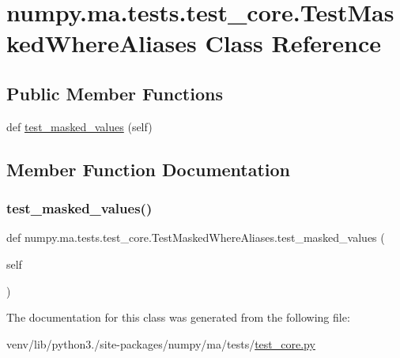 \hypertarget{classnumpy_1_1ma_1_1tests_1_1test__core_1_1TestMaskedWhereAliases}{}\section{numpy.\+ma.\+tests.\+test\+\_\+core.\+Test\+Masked\+Where\+Aliases Class Reference}
\label{classnumpy_1_1ma_1_1tests_1_1test__core_1_1TestMaskedWhereAliases}
\subsection*{Public Member Functions}
\begin{DoxyCompactItemize}
\item 
def \hyperlink{classnumpy_1_1ma_1_1tests_1_1test__core_1_1TestMaskedWhereAliases_acd993e3ab66673a73483f16f93eb00c7}{test\+\_\+masked\+\_\+values} (self)
\end{DoxyCompactItemize}


\subsection{Member Function Documentation}
\mbox{\label{classnumpy_1_1ma_1_1tests_1_1test__core_1_1TestMaskedWhereAliases_acd993e3ab66673a73483f16f93eb00c7}} 
\subsubsection{\texorpdfstring{test\+\_\+masked\+\_\+values()}{test\_masked\_values()}}
{\footnotesize\ttfamily def numpy.\+ma.\+tests.\+test\+\_\+core.\+Test\+Masked\+Where\+Aliases.\+test\+\_\+masked\+\_\+values (\begin{DoxyParamCaption}\item[{}]{self }\end{DoxyParamCaption})}



The documentation for this class was generated from the following file\+:\begin{DoxyCompactItemize}
\item 
venv/lib/python3./site-\/packages/numpy/ma/tests/\hyperlink{numpy_2ma_2tests_2test__core_8py}{test\+\_\+core.\+py}\end{DoxyCompactItemize}
